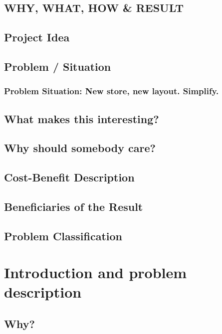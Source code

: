 \documentclass[a4paper,11pt]{article}
\begin{document}
\subsection{WHY, WHAT, HOW \& RESULT}

\subsection{Project Idea}
\subsection{Problem / Situation}

\subsubsection{Problem \/ Situation: New store, new layout. Simplify.}

\subsection{What makes this interesting?}

\subsection{Why should somebody care?}

\subsection{Cost-Benefit Description}

\subsection{Beneficiaries of the Result}

\subsection{Problem Classification}
\section{Introduction and problem description}
\label{sect:intro}
\subsection{Why?}
\end{document}
